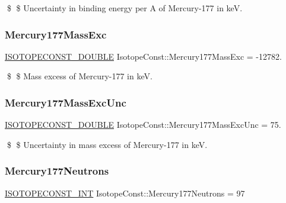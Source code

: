 \$ \$ Uncertainty in binding energy per A of Mercury-\/177 in keV. \mbox{\label{group___isotope_const-_mercury-_hg177_gada90b83e3fe99e7775c077587bee0019}} 
\subsubsection{\texorpdfstring{Mercury177\+Mass\+Exc}{Mercury177MassExc}}
{\footnotesize\ttfamily \mbox{\hyperlink{group___isotope_const-_macros_ga8f45a7272ce02c0b4c65c44636ed719a}{I\+S\+O\+T\+O\+P\+E\+C\+O\+N\+S\+T\+\_\+\+D\+O\+U\+B\+LE}} Isotope\+Const\+::\+Mercury177\+Mass\+Exc = -\/12782.}

\$ \$ Mass excess of Mercury-\/177 in keV. \mbox{\label{group___isotope_const-_mercury-_hg177_ga0195ef18ef4e9a5d3e5306f62c2c149f}} 
\subsubsection{\texorpdfstring{Mercury177\+Mass\+Exc\+Unc}{Mercury177MassExcUnc}}
{\footnotesize\ttfamily \mbox{\hyperlink{group___isotope_const-_macros_ga8f45a7272ce02c0b4c65c44636ed719a}{I\+S\+O\+T\+O\+P\+E\+C\+O\+N\+S\+T\+\_\+\+D\+O\+U\+B\+LE}} Isotope\+Const\+::\+Mercury177\+Mass\+Exc\+Unc = 75.}

\$ \$ Uncertainty in mass excess of Mercury-\/177 in keV. \mbox{\label{group___isotope_const-_mercury-_hg177_ga638a116ef306ce26ec70f193e71e9658}} 
\subsubsection{\texorpdfstring{Mercury177\+Neutrons}{Mercury177Neutrons}}
{\footnotesize\ttfamily \mbox{\hyperlink{group___isotope_const-_macros_ga5f18360b3e99483a35c32d789e62621c}{I\+S\+O\+T\+O\+P\+E\+C\+O\+N\+S\+T\+\_\+\+I\+NT}} Isotope\+Const\+::\+Mercury177\+Neutrons = 97}

